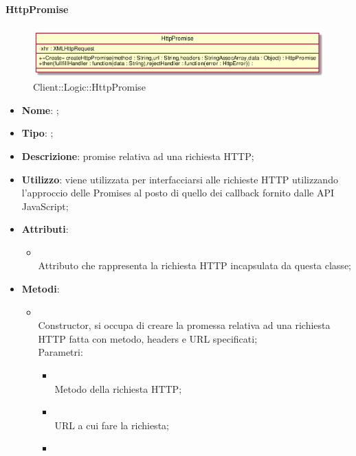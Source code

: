 \hypertarget{HttpPromise_label}{\paragraph{HttpPromise}}
\begin{figure}[h]
	\centering
	\includegraphics[width=\textwidth,height=\textheight,keepaspectratio]{images/ClassHttpPromise.png}
	\caption{Client::Logic::HttpPromise}
\end{figure}
\begin{itemize}
	\item \textbf{Nome}: ;
	\item \textbf{Tipo}: ;
	\item \textbf{Descrizione}: promise relativa ad una richiesta HTTP;
	\item \textbf{Utilizzo}: viene utilizzata per interfacciarsi alle richieste HTTP utilizzando l'approccio delle Promises al posto di quello dei callback fornito dalle API JavaScript;
	\item \textbf{Attributi}:
	\begin{itemize}
		\item[]  \\
		Attributo che rappresenta la richiesta HTTP incapsulata da questa classe;
	\end{itemize}
	\item \textbf{Metodi}:
	\begin{itemize}
		\item[]  \\
		Constructor, si occupa di creare la promessa relativa ad una richiesta HTTP fatta con metodo, headers e URL specificati;\\
		Parametri:
		\begin{itemize}
			\item {} \\
			Metodo della richiesta HTTP;
			\item {} \\
			URL a cui fare la richiesta;
			\item {} \\

\end{itemize}
\end{itemize}
\end{itemize}
